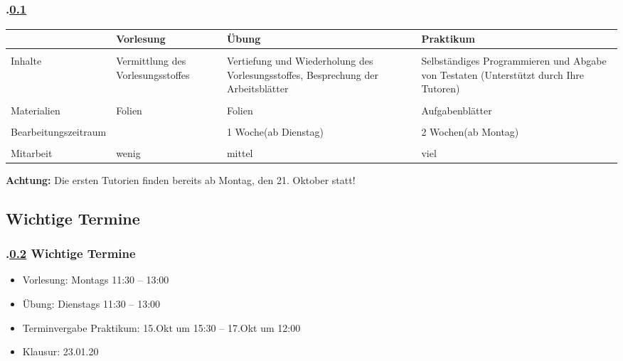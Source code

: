 \subsection{\stitle}\label{S:Einordnung}
\begin{frame}[fragile]%
  \frametitle{\kap.\ref{S:Einordnung} \stitle}%

  \begin{tabular}{p{2cm}|p{2.0cm}|p{2.7cm}|p{3.0cm}}
  & {\centering Vorlesung} & {\centering Übung} & {\centering Praktikum}\\
  \hline
  \hline & & &  \\
  Inhalte & Vermittlung des Vorlesungs\-stoffes & Vertiefung und Wiederholung des Vorlesungsstoffes, Besprechung der Arbeitsblätter & Selbständiges Programmieren und Abgabe von Testaten (Unterstützt durch Ihre Tutoren)\\
  \hline & & & \\
  Materialien & Folien & Folien & Aufgabenblätter\\
  \hline & & & \\
  Be\-ar\-bei\-tungs\-zeit\-raum & & 1 Woche\newline (ab Dienstag) & 2 Wochen\newline  (ab Montag)\\
  \hline & & & \\
  Mitarbeit & wenig & mittel & viel
  \end{tabular}
  \vfill

  \textbf{Achtung:} Die ersten Tutorien finden bereits ab Montag, den 21. Oktober statt!
\end{frame}


\def\stitle{Wichtige Termine}%
\subsection{\stitle}\label{S:Termine}
\begin{frame}[fragile]%
  \frametitle{\kap.\ref{S:Termine} \stitle}%

\begin{itemize}
  \item Vorlesung: Montags 11:30 -- 13:00
  \item Übung: Dienstags 11:30 -- 13:00
  \item Terminvergabe Praktikum: 15.Okt um 15:30 -- 17.Okt um 12:00
  \item Klausur: 23.01.20
\end{itemize}
\end{frame}
